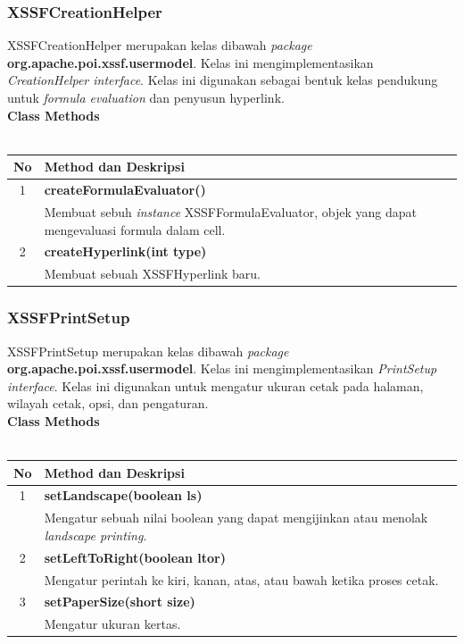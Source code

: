 \subsubsection{XSSFCreationHelper}
XSSFCreationHelper merupakan kelas dibawah \textit{package} \textbf{org.apache.poi.xssf.usermodel}. Kelas ini mengimplementasikan \textit{CreationHelper interface}. Kelas ini digunakan sebagai bentuk kelas pendukung untuk \textit{formula evaluation} dan penyusun hyperlink.\cite{tutpoint}
\\
\noindent \textbf{Class Methods}\\ \\
	\begin{tabular}{|c|p{12cm}|}
		\hline
		\textbf{No} & \textbf{Method dan Deskripsi} \\ \hline \hline
		1 & \textbf{createFormulaEvaluator()}\\
			&	Membuat sebuh \textit{instance} XSSFFormulaEvaluator, objek yang dapat mengevaluasi formula dalam cell.\\ \hline
		2 & \textbf{createHyperlink(int type)}\\
			&	Membuat sebuah XSSFHyperlink baru.\\ \hline
	\end{tabular}

\subsubsection{XSSFPrintSetup}
XSSFPrintSetup merupakan kelas dibawah \textit{package} \textbf{org.apache.poi.xssf.usermodel}. Kelas ini mengimplementasikan \textit{PrintSetup interface}. Kelas ini digunakan untuk mengatur ukuran cetak pada halaman, wilayah cetak, opsi, dan pengaturan.\cite{tutpoint}
\\
\noindent \textbf{Class Methods}\\ \\
	\begin{tabular}{|c|p{12cm}|}
		\hline
		\textbf{No} & \textbf{Method dan Deskripsi} \\ \hline \hline
		1 & \textbf{setLandscape(boolean ls)}\\
			&	Mengatur sebuah nilai boolean yang dapat mengijinkan atau menolak \textit{landscape printing}.\\ \hline
		2 & \textbf{setLeftToRight(boolean ltor)}\\
			&	Mengatur perintah ke kiri, kanan, atas, atau bawah ketika proses cetak.\\ \hline
		3 & \textbf{setPaperSize(short size)}\\
			&	Mengatur ukuran kertas.\\ \hline
	\end{tabular}
	
